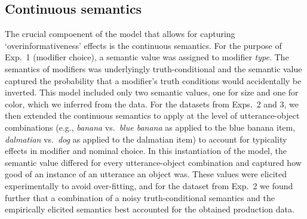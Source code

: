 \documentclass[11pt]{article}
\newcommand{\red}[1]{\textcolor{Red}{#1}}
\newcommand{\tableref}[1]{Table \ref{#1}}
\begin{document}
%

\subsection{Continuous semantics}
\label{sec:contsemantics}

The crucial compoenent of the model that allows for capturing `overinformativeness' effects is the continuous semantics.  For the purpose of Exp.~1 (modifier choice), a semantic value was assigned to modifier \emph{type}. The semantics of modifiers was underlyingly truth-conditional and the semantic value captured the probability that a modifier's truth conditions would accidentally be inverted. This model included only two semantic values, one for size and one for color, which we inferred from the data. For the datasets from Exps.~2 and 3, we then extended the continuous semantics to apply at the level of utterance-object  combinations (e.g., \emph{banana} vs.~\emph{blue banana} as applied to the blue banana item, \emph{dalmatian} vs.~\emph{dog} as applied to the dalmatian item) to account for typicality effects in modifier and nominal choice. In this instantiation of the model, the semantic value differed for every utterance-object combination and captured how good of an instance of an utterance an object was. These values were elicited experimentally to avoid over-fitting, and for the dataset from Exp.~2 we found further that a combination of a noisy truth-conditional semantics and the empirically elicited semantics best accounted for the obtained production data. %

\end{document}
